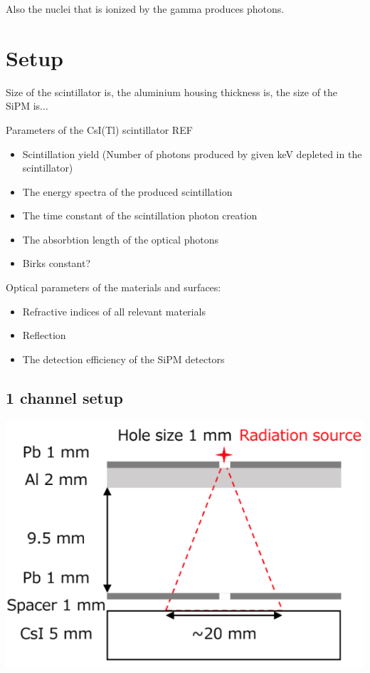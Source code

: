 \documentclass[12pt, a4paper,titlepage]{article}
\numberwithin{equation}{section}
\numberwithin{figure}{section}
\begin{document}
Also the nuclei that is ionized by the gamma produces photons.

\section{Setup}

Size of the scintillator is, the aluminium housing thickness is, the size of the SiPM is...

Parameters of the CsI(Tl) scintillator REF

\begin{itemize}
\item Scintillation yield (Number of photons produced by given keV depleted in the scintillator)
\item The energy spectra of the produced scintillation
\item The time constant of the scintillation photon creation
\item The absorbtion length of the optical photons
\item Birks constant?
\end{itemize}

Optical parameters of the materials and surfaces:
\begin{itemize}
\item Refractive indices of all relevant materials
\item Reflection
\item The detection efficiency of the SiPM detectors
\end{itemize}

\subsection{1 channel setup}

\includegraphics[width=150.0mm]{images/irradiation.png}
\end{document}
